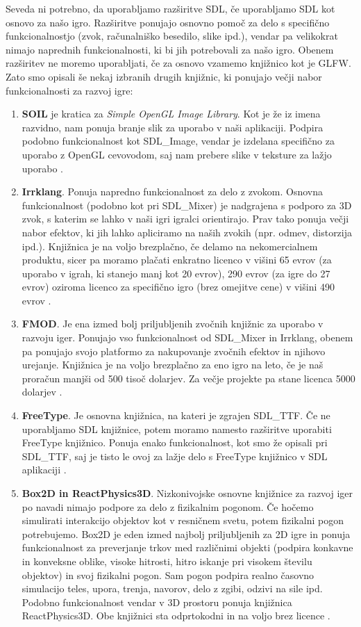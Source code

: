 \documentclass[12pt,a4paper,twoside]{book}
\begin{document}
Seveda ni potrebno, da uporabljamo razširitve SDL, če uporabljamo SDL kot osnovo za našo igro. Razširitve ponujajo osnovno pomoč za delo s specifično funkcionalnostjo (zvok, računalniško besedilo, slike ipd.), vendar pa velikokrat nimajo naprednih funkcionalnosti, ki bi jih potrebovali za našo igro. Obenem razširitev ne moremo uporabljati, če za osnovo vzamemo knjižnico kot je GLFW. Zato smo opisali še nekaj izbranih drugih knjižnic, ki ponujajo večji nabor funkcionalnosti za razvoj igre:
\begin{enumerate}
	\item \textbf{SOIL} je kratica za \textit{Simple OpenGL Image Library}. Kot je že iz imena razvidno, nam ponuja branje slik za uporabo v naši aplikaciji. Podpira podobno funkcionalnost kot SDL\_Image, vendar je izdelana specifično za uporabo z OpenGL cevovodom, saj nam prebere slike v teksture za lažjo uporabo \cite{soil}.
	\item \textbf{Irrklang}. Ponuja napredno funkcionalnost za delo z zvokom. Osnovna funkcionalnost (podobno kot pri SDL\_Mixer) je nadgrajena s podporo za 3D zvok, s katerim se lahko v naši igri igralci orientirajo. Prav tako ponuja večji nabor efektov, ki jih lahko apliciramo na naših zvokih (npr. odmev, distorzija ipd.). Knjižnica je na voljo brezplačno, če delamo na nekomercialnem produktu, sicer pa moramo plačati enkratno licenco v višini 65 evrov (za uporabo v igrah, ki stanejo manj kot 20 evrov), 290 evrov (za igre do 27 evrov) oziroma licenco za specifično igro (brez omejitve cene) v višini 490 evrov \cite{irrklang}. 
	\item \textbf{FMOD}. Je ena izmed bolj priljubljenih zvočnih knjižnic za uporabo v razvoju iger. Ponujajo vso funkcionalnost od SDL\_Mixer in Irrklang, obenem pa ponujajo svojo platformo za nakupovanje zvočnih efektov in njihovo urejanje. Knjižnica je na voljo brezplačno za eno igro na leto, če je naš proračun manjši od 500 tisoč dolarjev. Za večje projekte pa stane licenca 5000 dolarjev \cite{fmod}.
	\item \textbf{FreeType}. Je osnovna knjižnica, na kateri je zgrajen SDL\_TTF. Če ne uporabljamo SDL knjižnice, potem moramo namesto razširitve uporabiti FreeType knjižnico. Ponuja enako funkcionalnost, kot smo že opisali pri SDL\_TTF, saj je tisto le ovoj za lažje delo s FreeType knjižnico v SDL aplikaciji \cite{freetype}.
	\item \textbf{Box2D in ReactPhysics3D}. Nizkonivojske osnovne knjižnice za razvoj iger po navadi nimajo podpore za delo z fizikalnim pogonom. Če hočemo simulirati interakcijo objektov kot v resničnem svetu, potem fizikalni pogon potrebujemo. Box2D je eden izmed najbolj priljubljenih za 2D igre in ponuja funkcionalnost za preverjanje trkov med različnimi objekti (podpira konkavne in konveksne oblike, visoke hitrosti, hitro iskanje pri visokem številu objektov) in svoj fizikalni pogon. Sam pogon podpira realno časovno simulacijo teles, upora, trenja, navorov, delo z zgibi, odzivi na sile ipd. Podobno funkcionalnost vendar v 3D prostoru ponuja knjižnica ReactPhysics3D. Obe knjižnici sta odprtokodni in na voljo brez licence \cite{box2d} \cite{reactPhysics3d}.
\end{enumerate}
\end{document}
